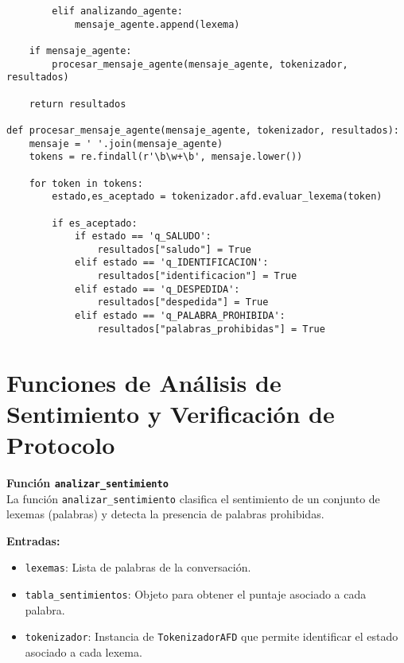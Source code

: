 \documentclass[12pt,a4paper]{article}
\begin{document}
\begin{verbatim}
        elif analizando_agente:
            mensaje_agente.append(lexema)

    if mensaje_agente:
        procesar_mensaje_agente(mensaje_agente, tokenizador, resultados)

    return resultados

def procesar_mensaje_agente(mensaje_agente, tokenizador, resultados):
    mensaje = ' '.join(mensaje_agente)
    tokens = re.findall(r'\b\w+\b', mensaje.lower())

    for token in tokens:
        estado,es_aceptado = tokenizador.afd.evaluar_lexema(token)

        if es_aceptado:
            if estado == 'q_SALUDO':
                resultados["saludo"] = True
            elif estado == 'q_IDENTIFICACION':
                resultados["identificacion"] = True
            elif estado == 'q_DESPEDIDA':
                resultados["despedida"] = True
            elif estado == 'q_PALABRA_PROHIBIDA':
                resultados["palabras_prohibidas"] = True

\end{verbatim}
\section*{Funciones de Análisis de Sentimiento y Verificación de Protocolo}

\textbf{Función \texttt{analizar\_sentimiento}}\\
La función \texttt{analizar\_sentimiento} clasifica el sentimiento de un conjunto de lexemas (palabras) y detecta la presencia de palabras prohibidas.

\textbf{Entradas:}
\begin{itemize}
    \item \texttt{lexemas}: Lista de palabras de la conversación.
    \item \texttt{tabla\_sentimientos}: Objeto para obtener el puntaje asociado a cada palabra.
    \item \texttt{tokenizador}: Instancia de \texttt{TokenizadorAFD} que permite identificar el estado asociado a cada lexema.
\end{itemize}
\end{document}
